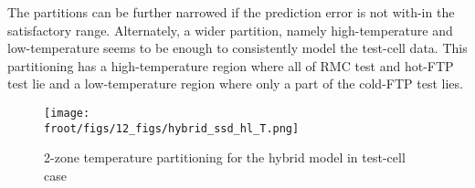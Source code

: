 The partitions can be further narrowed if the prediction error is not with-in the satisfactory range. Alternately, a wider partition, namely high-temperature and low-temperature seems to be enough to consistently model the test-cell data. This partitioning has a high-temperature region where all of RMC test and hot-FTP test lie and a low-temperature region where only a part of the cold-FTP test lies.

\begin{figure}[H]
        \centering
        \texttt{[image: \\froot/figs/12\_figs/hybrid\_ssd\_hl\_T.png]}
        \caption{2-zone temperature partitioning for the hybrid model in test-cell case}
\end{figure}
